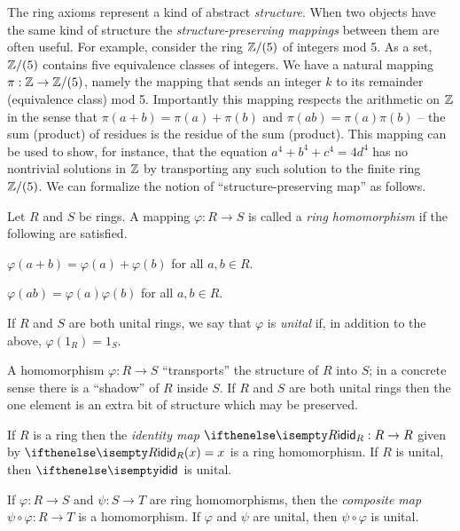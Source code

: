 The ring axioms represent a kind of abstract \emph{structure}.
When two objects have the same kind of structure the \emph{structure-preserving mappings} between them are often useful.
For example, consider the ring \(\mathbb{Z}/(5)\) of integers mod 5.
As a set, \(\mathbb{Z}/(5)\) contains five equivalence classes of integers.
We have a natural mapping \(\pi : \mathbb{Z} \rightarrow \mathbb{Z}/(5)\), namely the mapping that sends an integer \(k\) to its remainder (equivalence class) mod 5.
Importantly this mapping respects the arithmetic on \(\mathbb{Z}\) in the sense that \(\pi(a+b) = \pi(a) + \pi(b)\) and \(\pi(ab) = \pi(a)\pi(b)\) -- the sum (product) of residues is the residue of the sum (product).
This mapping can be used to show, for instance, that the equation \(a^4 + b^4 + c^4 = 4d^4\) has no nontrivial solutions in \(\mathbb{Z}\) by transporting any such solution to the finite ring \(\mathbb{Z}/(5)\).
We can formalize the notion of ``structure-preserving map'' as follows.

\begin{dfn} \label{dfn:ring-hom}
Let \(R\) and \(S\) be rings.
A mapping \(\varphi : R \rightarrow S\) is called a \emph{ring homomorphism} if the following are satisfied.
\begin{proplist}
\item \(\varphi(a + b) = \varphi(a) + \varphi(b)\) for all \(a,b \in R\).
\item \(\varphi(ab) = \varphi(a)\varphi(b)\) for all \(a,b \in R\).
\end{proplist}
If \(R\) and \(S\) are both unital rings, we say that \(\varphi\) is \emph{unital} if, in addition to the above, \(\varphi(1_R) = 1_S\).
\end{dfn}

A homomorphism \(\varphi : R \rightarrow S\) ``transports'' the structure of \(R\) into \(S\); in a concrete sense there is a ``shadow'' of \(R\) inside \(S\).
If \(R\) and \(S\) are both unital rings then the one element is an extra bit of structure which may be preserved.

\begin{prop} \mbox{} \label{prop:ring-cat}
\begin{proplist}
\item \label{prop:ring-cat:id} If \(R\) is a ring then the \emph{identity map} \(\ID[R] : R \rightarrow R\) given by \(\ID[R](x) = x\) is a ring homomorphism.
If \(R\) is unital, then \(\ID\) is unital.
\item \label{prop:ring-cat:comp} If \(\varphi : R \rightarrow S\) and \(\psi : S \rightarrow T\) are ring homomorphisms, then the \emph{composite map} \(\psi \circ \varphi : R \rightarrow T\) is a homomorphism.
If \(\varphi\) and \(\psi\) are unital, then \(\psi \circ \varphi\) is unital.
\end{proplist}
\end{prop}

